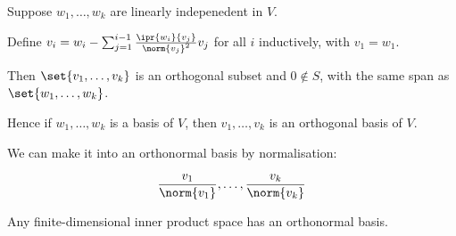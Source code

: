 \documentclass[11pt]{scrartcl}
\begin{document}
\begin{theorem}
  Suppose $w_1, \dots, w_k$ are linearly indepenedent in $V$.

  Define
  $v_i = w_i - \sum_{j=1}^{i-1}\frac{\ipr{w_i}{v_j}}{\norm{v_j}^2}v_j$
  for all $i$ inductively, with $v_1=w_1$.

  Then $\set{v_1, \dots, v_k}$ is an orthogonal subset and $0\not\in S$,
  with the same span as $\set{w_1,\dots, w_{k}}$.
\end{theorem}

\begin{remark}
  Hence if $w_1, \dots, w_{k}$ is a basis of $V$, then
  $v_1, \dots, v_{k}$ is an orthogonal basis of $V$.

  We can make it into an orthonormal basis by normalisation:

  \begin{equation*}
\frac{v_1}{\norm{v_1}}, \dots, \frac{v_k}{\norm{v_k}}
  \end{equation*}
\end{remark}

\begin{corollary}
  Any finite-dimensional inner product space has an orthonormal basis.
\end{corollary}
\end{document}
